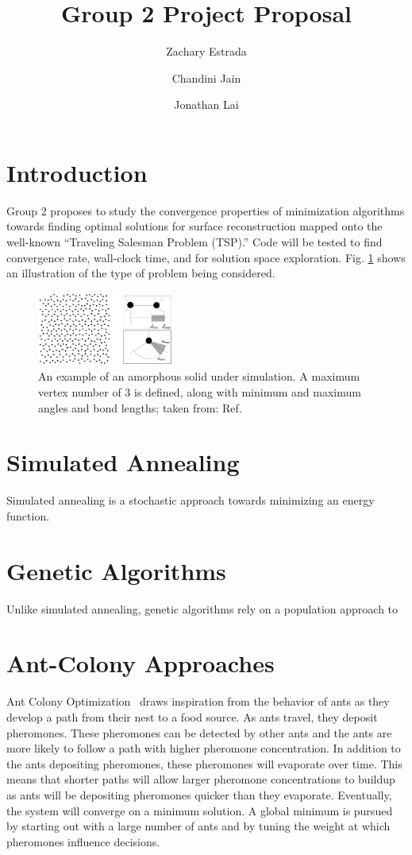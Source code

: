 \documentclass[10pt,twocolumn,notitlepage]{article}
\title{\vspace{-6ex} \textbf{Group 2 Project Proposal}}
\author{Zachary Estrada \and Chandini Jain \and Jonathan Lai}
\begin{document}
\maketitle

\section{Introduction}
Group 2 proposes to study the convergence properties of minimization algorithms towards finding optimal solutions for surface reconstruction mapped onto the well-known ``Traveling Salesman Problem (TSP).''  Code will be tested to find convergence rate, wall-clock time, and for solution space exploration. Fig. \ref{fig:amorphousSilicon} shows an illustration of the type of problem being considered.

\begin{figure}[h!]
	\centering
	\includegraphics[width=0.4\textwidth]{Figures/amorphousSilicon.png}
	\caption{An example of an amorphous solid under simulation.  A maximum vertex number of 3 is defined, along with minimum and maximum angles and bond lengths; taken from: Ref. \protect{}}
	\label{fig:amorphousSilicon}
\end{figure}


\section{Simulated Annealing}
Simulated annealing is a stochastic approach towards minimizing an energy function.

\section{Genetic Algorithms}
Unlike simulated annealing, genetic algorithms rely on a population approach to 

\section{Ant-Colony Approaches}
Ant Colony Optimization~\cite{Dorigo96theant} draws inspiration from the behavior of ants as they develop a path from their nest to a food source.  As ants travel, they deposit pheromones.  These pheromones can be detected by other ants and the ants are more likely to follow a path with higher pheromone concentration.  In addition to the ants depositing pheromones, these pheromones will evaporate over time.  This means that shorter paths will allow larger pheromone concentrations to buildup as ants will be depositing pheromones quicker than they evaporate.  Eventually, the system will converge on a minimum solution.  A global minimum is pursued by starting out with a large number of ants and by tuning the weight at which pheromones influence decisions. 
\end{document}
